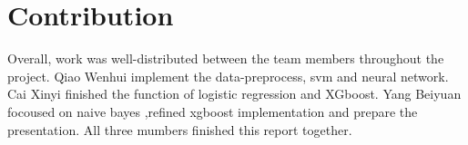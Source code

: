 \documentclass{article}
\begin{document}
\section{Contribution}
 Overall, work was well-distributed between the team members throughout the project. Qiao Wenhui implement the data-preprocess, svm and neural network. Cai Xinyi finished the function of logistic regression and XGboost. Yang Beiyuan focoused on naive bayes ,refined xgboost implementation and prepare the presentation. All three mumbers finished this report together.
\end{document}
